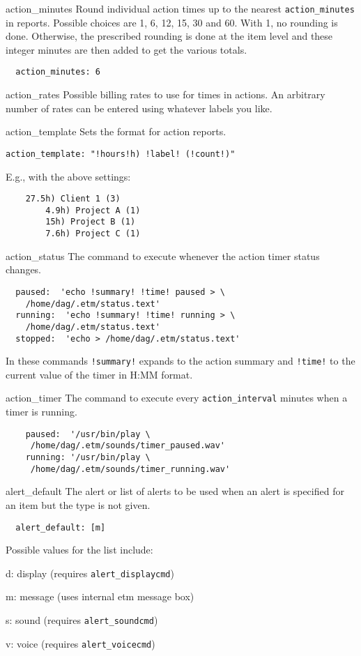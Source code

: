 \documentclass[9pt,landscape]{article}
\begin{document}
\begin{multicols}{3}
\begin{compactdesc}
\item[action\_minutes] Round individual action times up to the nearest \verb!action_minutes! in reports. Possible choices are 1, 6, 12, 15, 30 and 60. With 1, no rounding is done. Otherwise, the prescribed rounding is done at the item level and these integer minutes are then added to get the various totals.
\begin{verbatim}
  action_minutes: 6
\end{verbatim}

\item[action\_rates] Possible billing rates to use for times in actions. An arbitrary number of rates can be entered using whatever labels you like.

\item[action\_template] Sets the format for action reports.
\begin{verbatim}
action_template: "!hours!h) !label! (!count!)"
\end{verbatim}
E.g., with the above settings:
\begin{verbatim}
    27.5h) Client 1 (3)
        4.9h) Project A (1)
        15h) Project B (1)
        7.6h) Project C (1)
\end{verbatim}

\item[action\_status] The command to execute whenever the action timer status changes.
\begin{verbatim}
  paused:  'echo !summary! !time! paused > \
    /home/dag/.etm/status.text'
  running:  'echo !summary! !time! running > \
    /home/dag/.etm/status.text'
  stopped:  'echo > /home/dag/.etm/status.text'
\end{verbatim}
In these commands \verb'!summary!' expands to the action summary and \verb'!time!' to the current value of the timer in H:MM format.

\item[action\_timer] The command to execute every \verb'action_interval' minutes when a timer is running.
\begin{verbatim}
    paused:  '/usr/bin/play \
     /home/dag/.etm/sounds/timer_paused.wav'
    running: '/usr/bin/play \
     /home/dag/.etm/sounds/timer_running.wav'
\end{verbatim}

\item[alert\_default] The alert or list of alerts to be used when an alert is specified for an item but the type is not given.
\begin{verbatim}
  alert_default: [m]
\end{verbatim}
Possible values for the list include:
\begin{compactdesc}
\item[d:] display (requires \verb!alert_displaycmd!)
\item[m:] message (uses internal etm message box)
\item[s:] sound (requires \verb!alert_soundcmd!)
\item[v:] voice (requires \verb!alert_voicecmd!)
\end{compactdesc}


\end{compactdesc}
\end{multicols}
\end{document}

